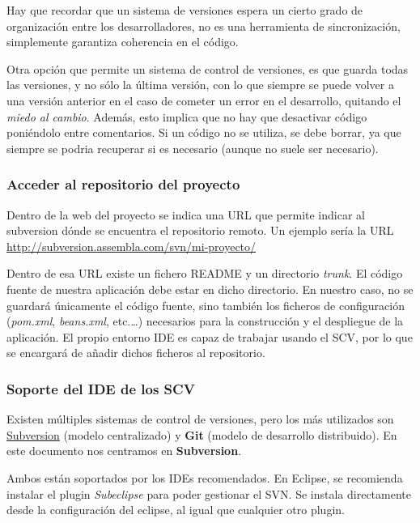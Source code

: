 \documentclass[11pt]{article}
\begin{document}
Hay que recordar que un sistema de versiones espera un cierto grado de
organización entre los desarrolladores, no es una herramienta de sincronización,
simplemente garantiza coherencia en el código.

Otra opción que permite un sistema de control de versiones, es que guarda todas
las versiones, y no sólo la última versión, con lo que siempre se puede volver a
una versión anterior en el caso de cometer un error en el desarrollo, quitando
el \emph{miedo al cambio}. Además, esto implica que no hay que desactivar código
poniéndolo entre comentarios. Si un código no se utiliza, se debe borrar, ya
que siempre se podria recuperar si es necesario (aunque no suele ser necesario).


\subsubsection{Acceder al repositorio del proyecto} \label{sec-7-2-1}

Dentro de la web del proyecto se indica una URL que permite indicar al
subversion dónde se encuentra el repositorio remoto. Un ejemplo sería la URL
\url{http://subversion.assembla.com/svn/mi-proyecto/}

Dentro de esa URL existe un fichero README y un directorio \emph{trunk}. El
código fuente de nuestra aplicación debe estar en dicho directorio. En nuestro
caso, no se guardará únicamente el código fuente, sino también los ficheros de
configuración (\emph{pom.xml}, \emph{beans.xml}, etc.\ldots{}) necesarios para la construcción y el despliegue de la aplicación. El propio entorno
IDE es capaz de trabajar usando el SCV, por lo que se encargará de añadir dichos
ficheros al repositorio.

\subsubsection{Soporte del IDE de los SCV}
\label{sec-7-2-2}

Existen múltiples sistemas de control de versiones, pero los más utilizados son
\href{http://www.subversion.org}{Subversion} (modelo centralizado) y 
\textbf{Git} (modelo de desarrollo distribuido). En este documento nos centramos en \textbf{Subversion}.

Ambos están soportados por los IDEs recomendados. En Eclipse, se recomienda instalar
el plugin \emph{Subeclipse} para poder gestionar el SVN. Se instala directamente desde la
configuración del eclipse, al igual que cualquier otro plugin.
\end{document}
